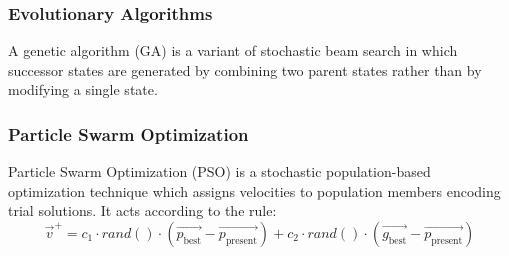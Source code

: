 \subsubsection{Evolutionary Algorithms}
A genetic algorithm (GA) is a variant of stochastic beam search in which successor states are generated by combining two parent states rather than by modifying a single state.

\begin{algorithmic}[1]
            \State{}



                \State{}
                \EndIf{}

            \EndFoor{}
        \EndWhile{}

        \State{}
    \EndFunction{}


        \State{}


    \EndFunction{}
\end{algorithmic}

\subsubsection{Particle Swarm Optimization}
Particle Swarm Optimization (PSO) is a stochastic population-based optimization technique which assigns velocities to population members encoding trial solutions. It acts according to the rule:
\begin{equation*}
    \overrightarrow{v}^+ = c_1 \cdot rand() \cdot (\overrightarrow{p_\text{best}} - \overrightarrow{p_\text{present}}) + c_2 \cdot rand() \cdot (\overrightarrow{g_\text{best}} - \overrightarrow{p_\text{present}})
\end{equation*}


